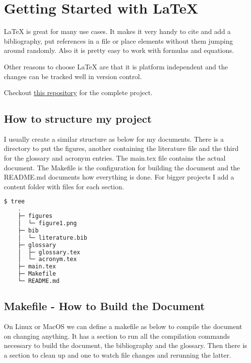 \documentclass{article}
\begin{document}
  \section{Getting Started with LaTeX}

  LaTeX is great for many use cases. It makes it very handy to cite and add a
  bibliography, put references in a file or place elements without them jumping
  around randomly. Also it is pretty easy to work with formulas and equations.

  Other reasons to choose LaTeX are that it is platform independent and the
  changes can be tracked well in version control.

  Checkout \href{https://git.sr.ht/~busykoala/latex_article}{this repository}
  for the complete project.

  \subsection{How to structure my project}

  I usually create a similar structure as below for my documents. There is a
  directory to put the figures, another containing the literature file and the
  third for the glossary and acronym entries.
  The main.tex file contains the actual document. The Makefile is the
  configuration for building the document and the README.md documents how
  everything is done. For bigger projects I add a content folder with files for
  each section.

  \begin{lstlisting}[language=Bash]
  $ tree
    .
    ├─ figures
    │  └─ figure1.png
    ├─ bib
    │  └─ literature.bib
    ├─ glossary
    │  ├─ glossary.tex
    │  └─ acronym.tex
    ├─ main.tex
    ├─ Makefile
    └─ README.md
  \end{lstlisting}

  \subsection{Makefile - How to Build the Document}

  On Linux or MacOS we can define a makefile as below to compile the document
  on changing anything. It has a section to run all the compilation commands
  necessary to build the document, the bibliography and the glossary. Then
  there is a section to clean up and one to watch file changes and rerunning
  the latter.
\end{document}

